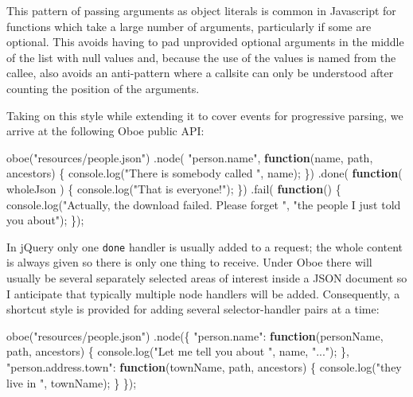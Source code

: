 \documentclass[12pt, ]{article}
\newenvironment{Shaded}{}{}
\newcommand{\KeywordTok}[1]{\textcolor[rgb]{0.00,0.44,0.13}{\textbf{{#1}}}}
\newcommand{\StringTok}[1]{\textcolor[rgb]{0.25,0.44,0.63}{{#1}}}
\newcommand{\OtherTok}[1]{\textcolor[rgb]{0.00,0.44,0.13}{{#1}}}
\newcommand{\FunctionTok}[1]{\textcolor[rgb]{0.02,0.16,0.49}{{#1}}}
\newcommand{\NormalTok}[1]{{#1}}
\begin{document}
This pattern of passing arguments as object literals is common in
Javascript for functions which take a large number of arguments,
particularly if some are optional. This avoids having to pad unprovided
optional arguments in the middle of the list with null values and,
because the use of the values is named from the callee, also avoids an
anti-pattern where a callsite can only be understood after counting the
position of the arguments.

Taking on this style while extending it to cover events for progressive
parsing, we arrive at the following Oboe public API:

\begin{Shaded}
\begin{Highlighting}[]
\FunctionTok{oboe}\NormalTok{(}\StringTok{"resources/people.json"}\NormalTok{)}
   \NormalTok{.}\FunctionTok{node}\NormalTok{( }\StringTok{"person.name"}\NormalTok{, }\KeywordTok{function}\NormalTok{(name, path, ancestors) \{}
      \OtherTok{console}\NormalTok{.}\FunctionTok{log}\NormalTok{(}\StringTok{"There is somebody called "}\NormalTok{, name);   }
   \NormalTok{\})}
   \NormalTok{.}\FunctionTok{done}\NormalTok{( }\KeywordTok{function}\NormalTok{( wholeJson ) \{}
      \OtherTok{console}\NormalTok{.}\FunctionTok{log}\NormalTok{(}\StringTok{"That is everyone!"}\NormalTok{);}
   \NormalTok{\})}
   \NormalTok{.}\FunctionTok{fail}\NormalTok{( }\KeywordTok{function}\NormalTok{() \{}
      \OtherTok{console}\NormalTok{.}\FunctionTok{log}\NormalTok{(}\StringTok{"Actually, the download failed. Please forget "}\NormalTok{, }
                  \StringTok{"the people I just told you about"}\NormalTok{);}
   \NormalTok{\});}
\end{Highlighting}
\end{Shaded}

In jQuery only one \texttt{done} handler is usually added to a request;
the whole content is always given so there is only one thing to receive.
Under Oboe there will usually be several separately selected areas of
interest inside a JSON document so I anticipate that typically multiple
node handlers will be added. Consequently, a shortcut style is provided
for adding several selector-handler pairs at a time:

\begin{Shaded}
\begin{Highlighting}[]
\FunctionTok{oboe}\NormalTok{(}\StringTok{"resources/people.json"}\NormalTok{)}
   \NormalTok{.}\FunctionTok{node}\NormalTok{(\{  }
      \StringTok{"person.name"}\NormalTok{: }\KeywordTok{function}\NormalTok{(personName, path, ancestors) \{}
         \OtherTok{console}\NormalTok{.}\FunctionTok{log}\NormalTok{(}\StringTok{"Let me tell you about "}\NormalTok{, name, }\StringTok{"..."}\NormalTok{);}
      \NormalTok{\},}
      \StringTok{"person.address.town"}\NormalTok{: }\KeywordTok{function}\NormalTok{(townName, path, ancestors) \{}
         \OtherTok{console}\NormalTok{.}\FunctionTok{log}\NormalTok{(}\StringTok{"they live in "}\NormalTok{, townName);}
      \NormalTok{\}}
   \NormalTok{\});}
\end{Highlighting}
\end{Shaded}
\end{document}
